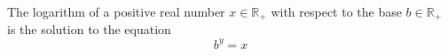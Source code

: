 The logarithm of a positive real number $x \in \mathbb{R}_+$ with respect to the base $b \in \mathbb{R}_{+}$ is the solution to the equation
$$b^y = x$$ 
